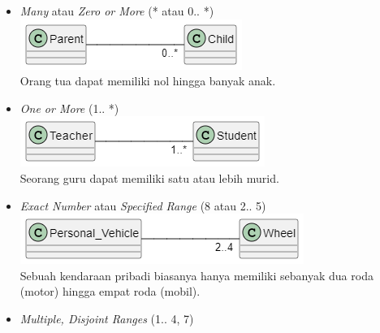 \documentclass[a4paper]{article}
\begin{document}
\begin{enumerate}
\begin{itemize}
        \item \textit{Many} atau \textit{Zero or More} (* atau 0.. *)\\
            \includegraphics[scale=0.475]{multiplicity many example.png}\\
            Orang tua dapat memiliki nol hingga banyak anak.
        \item \textit{One or More} (1.. *)\\
            \includegraphics[scale=0.475]{multiplicity one or more example.png}\\
            Seorang guru dapat memiliki satu atau lebih murid.
        \item \textit{Exact Number} atau \textit{Specified Range} (8 atau 2.. 5)\\
            \includegraphics[scale=0.475]{multiplicity specified range example.png}\\
            Sebuah kendaraan pribadi biasanya hanya memiliki sebanyak dua roda (motor) hingga empat roda (mobil).
        \item \textit{Multiple, Disjoint Ranges} (1.. 4, 7)\\

\end{itemize}
\end{enumerate}
\end{document}
